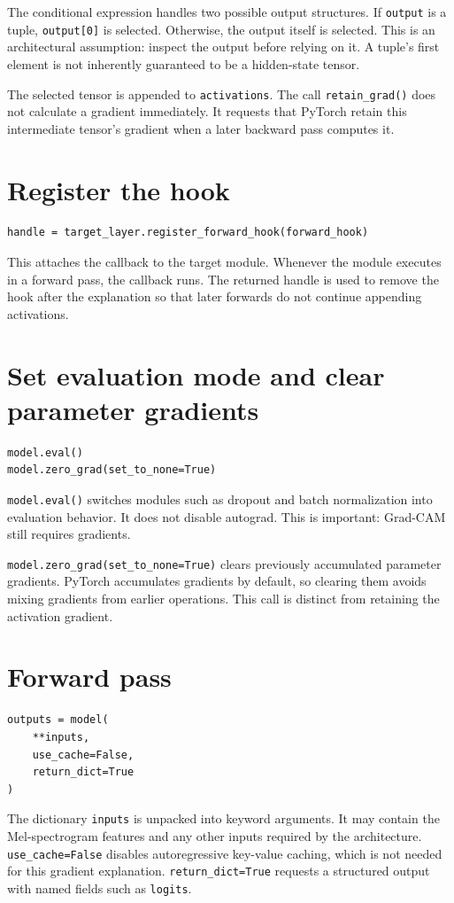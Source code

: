 \documentclass[11pt,a4paper]{article}
\begin{document}
The conditional expression handles two possible output structures. If \texttt{output} is a tuple, \texttt{output[0]} is selected. Otherwise, the output itself is selected. This is an architectural assumption: inspect the output before relying on it. A tuple's first element is not inherently guaranteed to be a hidden-state tensor.

The selected tensor is appended to \texttt{activations}. The call \texttt{retain\_grad()} does not calculate a gradient immediately. It requests that PyTorch retain this intermediate tensor's gradient when a later backward pass computes it.

\section{Register the hook}
\begin{lstlisting}[style=python]
handle = target_layer.register_forward_hook(forward_hook)
\end{lstlisting}
This attaches the callback to the target module. Whenever the module executes in a forward pass, the callback runs. The returned handle is used to remove the hook after the explanation so that later forwards do not continue appending activations.

\section{Set evaluation mode and clear parameter gradients}
\begin{lstlisting}[style=python]
model.eval()
model.zero_grad(set_to_none=True)
\end{lstlisting}
\texttt{model.eval()} switches modules such as dropout and batch normalization into evaluation behavior. It does not disable autograd. This is important: Grad-CAM still requires gradients.

\texttt{model.zero\_grad(set\_to\_none=True)} clears previously accumulated parameter gradients. PyTorch accumulates gradients by default, so clearing them avoids mixing gradients from earlier operations. This call is distinct from retaining the activation gradient.

\section{Forward pass}
\begin{lstlisting}[style=python]
outputs = model(
    **inputs,
    use_cache=False,
    return_dict=True
)
\end{lstlisting}
The dictionary \texttt{inputs} is unpacked into keyword arguments. It may contain the Mel-spectrogram features and any other inputs required by the architecture. \texttt{use\_cache=False} disables autoregressive key-value caching, which is not needed for this gradient explanation. \texttt{return\_dict=True} requests a structured output with named fields such as \texttt{logits}.
\end{document}
